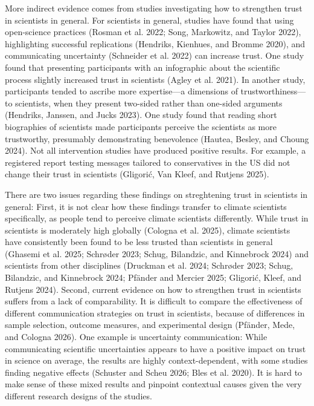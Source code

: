 \documentclass[
  letterpaper,
  DIV=11,
  numbers=noendperiod]{scrartcl}
\begin{document}
More indirect evidence comes from studies investigating how to
strengthen trust in scientists in general. For scientists in general,
studies have found that using open-science practices (Rosman et al.
2022; Song, Markowitz, and Taylor 2022), highlighting successful
replications (Hendriks, Kienhues, and Bromme 2020), and communicating
uncertainty (Schneider et al. 2022) can increase trust. One study found
that presenting participants with an infographic about the scientific
process slightly increased trust in scientists (Agley et al. 2021). In
another study, participants tended to ascribe more expertise---a
dimensions of trustworthiness---to scientists, when they present
two-sided rather than one-sided arguments (Hendriks, Janssen, and Jucks
2023). One study found that reading short biographies of scientists made
participants perceive the scientists as more trustworthy, presumably
demonstrating benevolence (Hautea, Besley, and Choung 2024). Not all
intervention studies have produced positive results. For example, a
registered report testing messages tailored to conservatives in the US
did not change their trust in scientists (Gligorić, Van Kleef, and
Rutjens 2025).

There are two issues regarding these findings on streghtening trust in
scientists in general: First, it is not clear how these findings
transfer to climate scientists specifically, as people tend to perceive
climate scientists differently. While trust in scientists is moderately
high globally (Cologna et al. 2025), climate scientists have
consistently been found to be less trusted than scientists in general
(Ghasemi et al. 2025; Schrøder 2023; Schug, Bilandzic, and Kinnebrock
2024) and scientists from other disciplines (Druckman et al. 2024;
Schrøder 2023; Schug, Bilandzic, and Kinnebrock 2024; Pfänder and
Mercier 2025; Gligorić, Kleef, and Rutjens 2024). Second, current
evidence on how to strengthen trust in scientists suffers from a lack of
comparability. It is difficult to compare the effectiveness of different
communication strategies on trust in scientists, because of differences
in sample selection, outcome measures, and experimental design (Pfänder,
Mede, and Cologna 2026). One example is uncertainty communication: While
communicating scientific uncertainties appears to have a positive impact
on trust in science on average, the results are highly
context-dependent, with some studies finding negative effects (Schuster
and Scheu 2026; Bles et al. 2020). It is hard to make sense of these
mixed results and pinpoint contextual causes given the very different
research designs of the studies.
\end{document}
